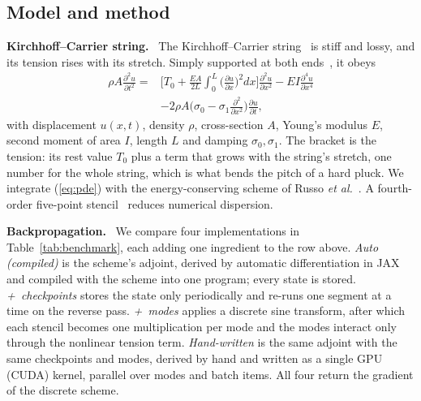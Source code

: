 \documentclass[a4paper]{article}
\newcommand{\head}[1]{\par\vspace{1pt}\noindent\textbf{#1.}\ \ignorespaces}
\begin{document}
\begin{sloppy}
\section{Model and method}
\head{Kirchhoff--Carrier string}
The Kirchhoff--Carrier string~\cite[Sec.~8.1]{bilbao2009} is stiff and lossy,
and its tension rises with its stretch. Simply supported at both
ends~\cite{russo2026}, it obeys
\begin{equation}
\begin{aligned}
\rho A\frac{\partial^2u}{\partial t^2}={}&
 \bigg[T_0+\frac{EA}{2L}\!\int_0^L\!\Big(\frac{\partial u}{\partial x}\Big)^{\!2}dx\bigg]
 \frac{\partial^2u}{\partial x^2}
 -EI\frac{\partial^4u}{\partial x^4}\\
 &-2\rho A\Big(\sigma_0-\sigma_1\frac{\partial^2}{\partial x^2}\Big)
 \frac{\partial u}{\partial t},
\end{aligned}
\label{eq:pde}
\end{equation}
with displacement $u(x,t)$, density $\rho$, cross-section $A$, Young's
modulus $E$, second moment of area $I$, length $L$ and damping
$\sigma_0,\sigma_1$. The bracket is the tension: its rest value $T_0$ plus a
term that grows with the string's stretch, one number for the whole string,
which is what bends the pitch of a hard pluck. We integrate
(\ref{eq:pde}) with the energy-conserving scheme of Russo \emph{et
al.}~\cite{russo2026}. A fourth-order five-point
stencil~\cite[Sec.~6.3.1]{bilbao2009} reduces
numerical dispersion.

\head{Backpropagation}
We compare four implementations in Table~\ref{tab:benchmark}, each adding
one ingredient to the row above. \emph{Auto (compiled)} is the scheme's
adjoint, derived by automatic differentiation in JAX and compiled with the
scheme into one program; every state is stored. \emph{+~checkpoints} stores the state only
periodically and re-runs one segment at a time on the reverse pass.
\emph{+~modes} applies a discrete sine transform, after which each stencil
becomes one multiplication per mode and the modes interact only through the
nonlinear tension term. \emph{Hand-written} is the same adjoint with the
same checkpoints and modes, derived by hand and written as a single GPU
(CUDA\footnotemark) kernel, parallel over modes and batch items. All four return the
gradient of the discrete scheme.


\end{sloppy}
\end{document}
